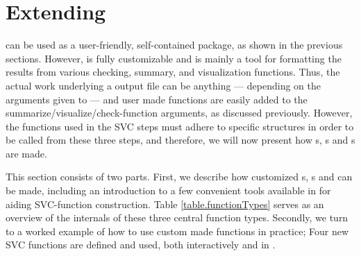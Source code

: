 \documentclass[article,shortnames]{jss}
\begin{document}
\section[Extending dataMaid]{Extending }
\label{sec:extending}

 can be used as a user-friendly, self-contained package, as
shown in the previous sections. However,  is fully
customizable and  is mainly a tool for formatting the
results from various checking, summary,  and visualization
functions. Thus, the actual work underlying a  output file
can be anything --- depending on the arguments given to 
--- and user made functions are easily added to the
summarize/visualize/check-function arguments, as discussed previously.
However, the functions used in the SVC steps must adhere
to specific structures in order to be called from these three steps, and
therefore, we will now present how s,
s and s are made.


This section consists of two parts. First, we describe how customized
s, s and
 can be made, including an introduction to a few
convenient tools available in  for aiding SVC-function
construction.  Table \ref{table.functionTypes} serves as an overview
of the internals of these three central function types. Secondly, we
turn to a worked example of how to use custom made functions in
practice; Four new SVC functions are defined and used, both
interactively and in .
\end{document}

